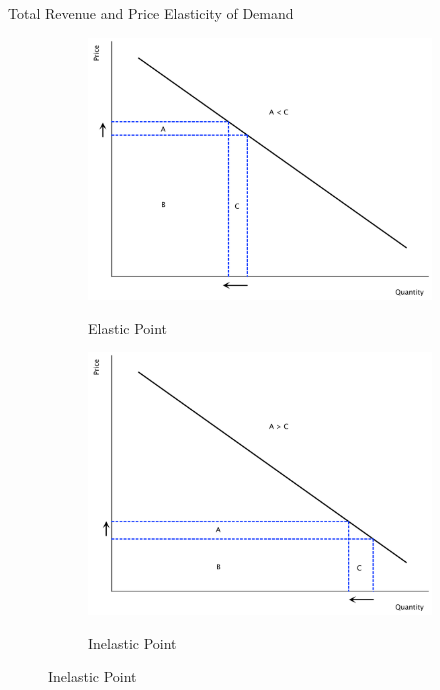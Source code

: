 \documentclass[xcolor={dvipsnames},pdf, hyperref={colorlinks=true, citecolor=ForestGreen, linkcolor=BlueViolet, urlcolor=Magenta}]{beamer}
\newcommand{\blank}[0]{}
\newcommand{\ddp}[1]{{\textcolor{ForestGreen}{#1}}}
\begin{document}
\begin{frame}{Total Revenue and Price Elasticity of Demand}

	\begin{figure}[H]
		\centering
		\caption{Comparing Demand Elasticities and Total Revenue}
		\blank\blank\blank
		\begin{subfigure}{.3\textwidth}
			\ddp{\includegraphics[scale=.18]{plot27.pdf}}
			\caption{Elastic Point}
		\end{subfigure}%
		\begin{subfigure}{.3\textwidth}
			\centering
			\ddp{\includegraphics[scale=.18]{plot29.pdf}}
			\caption{Inelastic Point}
		\end{subfigure}

\end{figure}
\end{frame}
\end{document}
